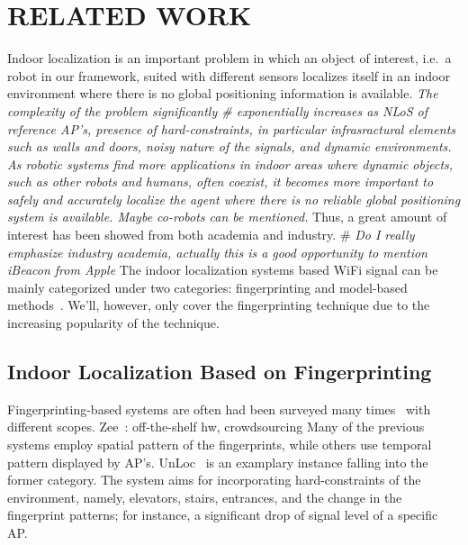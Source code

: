 \documentclass[letterpaper, 10 pt, conference]{ieeeconf}  %
\newcommand{\lorem}{
}
\begin{document}
%
%
%
\section{\label{sec-RW}RELATED WORK}
  Indoor localization is an important problem in which an object of interest, i.e.\ a robot in our framework, suited with different sensors localizes itself in an indoor environment where there is no global positioning information is available.
  \textit{The complexity of the problem significantly \# \textit{exponentially} increases as NLoS of reference AP's, presence of hard-constraints, in particular infrasractural elements such as walls and doors, noisy nature of the signals, and dynamic environments.}~\cite{liu2007survey}
  \textit{As robotic systems find more applications in indoor areas where dynamic objects, such as other robots and humans, often coexist, it becomes more important to safely and accurately localize the agent where there is no reliable global positioning system is available.
  Maybe co-robots can be mentioned.}
  Thus, a great amount of interest has been showed from both academia and industry.
  \# \textit{Do I really emphasize industry academia, actually this is a good opportunity to mention iBeacon from Apple}
  The indoor localization systems based WiFi signal can be mainly categorized under two categories: fingerprinting and model-based methods~\cite{hossain2015survey}.
  We'll, however, only cover the fingerprinting technique due to the increasing popularity of the technique.

  \subsection{Indoor Localization Based on Fingerprinting}
    Fingerprinting-based systems are often   had been surveyed many times~\cite{he2016wi} with different scopes.
    Zee~\cite{rai2012zee}: off-the-shelf hw, crowdsourcing
    Many of the previous systems employ spatial pattern of the fingerprints, while others use temporal pattern displayed by AP's.
    UnLoc~\cite{wang2012no} is an examplary instance falling into the former category.
    The system aims for incorporating hard-constraints of the environment, namely, elevators, stairs, entrances, and the change in the fingerprint patterns; for instance, a significant drop of signal level of a specific AP\@.
\end{document}
